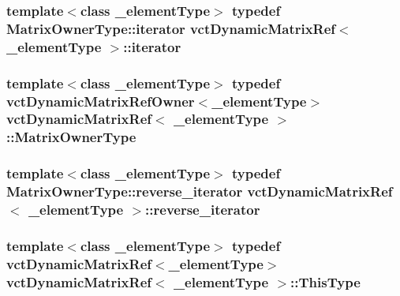 \subsubsection[{iterator}]{\setlength{\rightskip}{0pt plus 5cm}template$<$class \+\_\+element\+Type$>$ typedef {\bf Matrix\+Owner\+Type\+::iterator} {\bf vct\+Dynamic\+Matrix\+Ref}$<$ \+\_\+element\+Type $>$\+::{\bf iterator}}\label{classvct_dynamic_matrix_ref_a96cb0ad0104a135e19f1e39567a16ef2}
\hypertarget{classvct_dynamic_matrix_ref_a24cb066b24bdc74c68af35e7c88f8a07}{}
\subsubsection[{Matrix\+Owner\+Type}]{\setlength{\rightskip}{0pt plus 5cm}template$<$class \+\_\+element\+Type$>$ typedef {\bf vct\+Dynamic\+Matrix\+Ref\+Owner}$<$\+\_\+element\+Type$>$ {\bf vct\+Dynamic\+Matrix\+Ref}$<$ \+\_\+element\+Type $>$\+::{\bf Matrix\+Owner\+Type}}\label{classvct_dynamic_matrix_ref_a24cb066b24bdc74c68af35e7c88f8a07}
\hypertarget{classvct_dynamic_matrix_ref_ad797e9f33fe82864e8df2c8c6a30b383}{}
\subsubsection[{reverse\+\_\+iterator}]{\setlength{\rightskip}{0pt plus 5cm}template$<$class \+\_\+element\+Type$>$ typedef {\bf Matrix\+Owner\+Type\+::reverse\+\_\+iterator} {\bf vct\+Dynamic\+Matrix\+Ref}$<$ \+\_\+element\+Type $>$\+::{\bf reverse\+\_\+iterator}}\label{classvct_dynamic_matrix_ref_ad797e9f33fe82864e8df2c8c6a30b383}
\hypertarget{classvct_dynamic_matrix_ref_ac01200e3df0afe95f5d3948da84c8551}{}
\subsubsection[{This\+Type}]{\setlength{\rightskip}{0pt plus 5cm}template$<$class \+\_\+element\+Type$>$ typedef {\bf vct\+Dynamic\+Matrix\+Ref}$<$\+\_\+element\+Type$>$ {\bf vct\+Dynamic\+Matrix\+Ref}$<$ \+\_\+element\+Type $>$\+::{\bf This\+Type}}\label{classvct_dynamic_matrix_ref_ac01200e3df0afe95f5d3948da84c8551}


